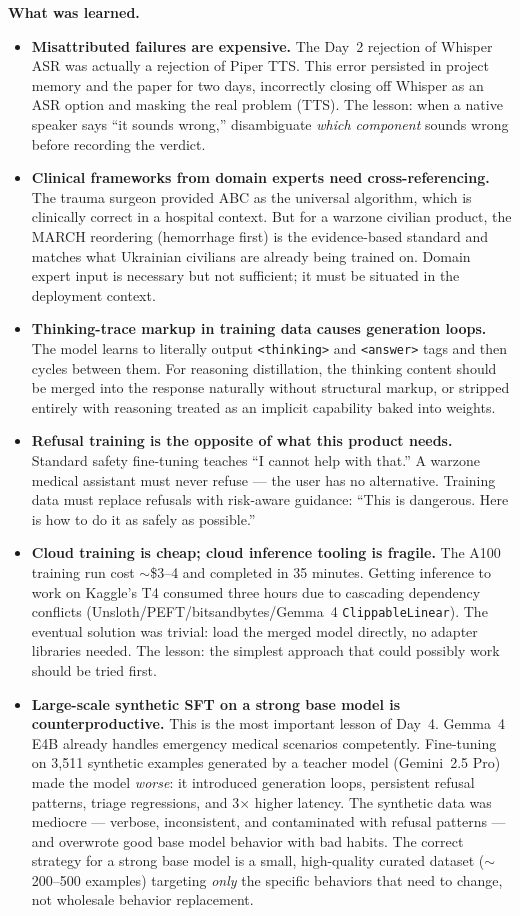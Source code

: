 \documentclass{article}
\theoremstyle{plain}
\theoremstyle{definition}
\theoremstyle{remark}
\begin{document}
\textbf{What was learned.}
\begin{itemize}
\item \textbf{Misattributed failures are expensive.} The Day~2 rejection of Whisper ASR was actually a rejection of Piper TTS. This error persisted in project memory and the paper for two days, incorrectly closing off Whisper as an ASR option and masking the real problem (TTS). The lesson: when a native speaker says ``it sounds wrong,'' disambiguate \emph{which component} sounds wrong before recording the verdict.
\item \textbf{Clinical frameworks from domain experts need cross-referencing.} The trauma surgeon provided ABC as the universal algorithm, which is clinically correct in a hospital context. But for a warzone civilian product, the MARCH reordering (hemorrhage first) is the evidence-based standard and matches what Ukrainian civilians are already being trained on. Domain expert input is necessary but not sufficient; it must be situated in the deployment context.
\item \textbf{Thinking-trace markup in training data causes generation loops.} The model learns to literally output \texttt{<thinking>} and \texttt{<answer>} tags and then cycles between them. For reasoning distillation, the thinking content should be merged into the response naturally without structural markup, or stripped entirely with reasoning treated as an implicit capability baked into weights.
\item \textbf{Refusal training is the opposite of what this product needs.} Standard safety fine-tuning teaches ``I cannot help with that.'' A warzone medical assistant must never refuse --- the user has no alternative. Training data must replace refusals with risk-aware guidance: ``This is dangerous. Here is how to do it as safely as possible.''
\item \textbf{Cloud training is cheap; cloud inference tooling is fragile.} The A100 training run cost $\sim$\$3--4 and completed in 35 minutes. Getting inference to work on Kaggle's T4 consumed three hours due to cascading dependency conflicts (Unsloth/PEFT/bitsandbytes/Gemma~4 \texttt{ClippableLinear}). The eventual solution was trivial: load the merged model directly, no adapter libraries needed. The lesson: the simplest approach that could possibly work should be tried first.
\item \textbf{Large-scale synthetic SFT on a strong base model is counterproductive.} This is the most important lesson of Day~4. Gemma~4 E4B already handles emergency medical scenarios competently. Fine-tuning on 3{,}511 synthetic examples generated by a teacher model (Gemini~2.5 Pro) made the model \emph{worse}: it introduced generation loops, persistent refusal patterns, triage regressions, and 3$\times$ higher latency. The synthetic data was mediocre --- verbose, inconsistent, and contaminated with refusal patterns --- and overwrote good base model behavior with bad habits. The correct strategy for a strong base model is a small, high-quality curated dataset ($\sim$200--500 examples) targeting \emph{only} the specific behaviors that need to change, not wholesale behavior replacement.

\end{itemize}
\end{document}
